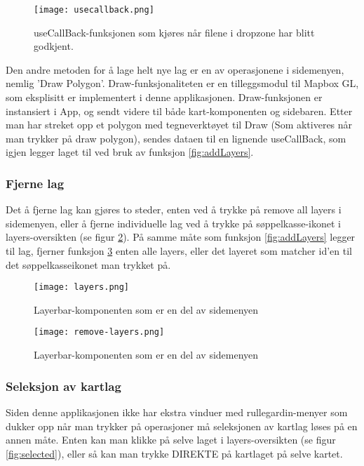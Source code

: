 \begin{figure}[h]
    \center
    \texttt{[image: usecallback.png]}
    \caption{useCallBack-funksjonen som kjøres når filene i dropzone har blitt godkjent.}
    \label{fig:usecallback}
\end{figure}

Den andre metoden for å lage helt nye lag er en av operasjonene i sidemenyen, nemlig 'Draw Polygon'. Draw-funksjonaliteten er en tilleggsmodul til Mapbox GL, som eksplisitt er implementert i denne applikasjonen. Draw-funksjonen er instansiert i App, og sendt videre til både kart-komponenten og sidebaren. Etter man har streket opp et polygon med tegneverktøyet til Draw (Som aktiveres når man trykker på draw polygon), sendes dataen til en lignende useCallBack, som igjen legger laget til ved bruk av funksjon \ref{fig:addLayers}.

\subsubsection{Fjerne lag}

Det å fjerne lag kan gjøres to steder, enten ved å trykke på remove all layers i sidemenyen, eller å fjerne individuelle lag ved å trykke på søppelkasse-ikonet i layers-oversikten (se figur \ref{fig:layerbar}). På samme måte som funksjon \ref{fig:addLayers} legger til lag, fjerner funksjon \ref{fig:remove} enten alle layers, eller det layeret som matcher id'en til det søppelkasseikonet man trykket på. 

\begin{figure}[h]
    \center
    \texttt{[image: layers.png]}
    \caption{Layerbar-komponenten som er en del av sidemenyen}
    \label{fig:layerbar}
\end{figure}

\begin{figure}[h]
    \center
    \texttt{[image: remove-layers.png]}
    \caption{Layerbar-komponenten som er en del av sidemenyen}
    \label{fig:remove}
\end{figure}

\subsubsection{Seleksjon av kartlag}

Siden denne applikasjonen ikke har ekstra vinduer med rullegardin-menyer som dukker opp når man trykker på operasjoner må seleksjonen av kartlag løses på en annen måte. Enten kan man klikke på selve laget i layers-oversikten (se figur \ref{fig:selected}), eller så kan man trykke DIREKTE på kartlaget på selve kartet.

